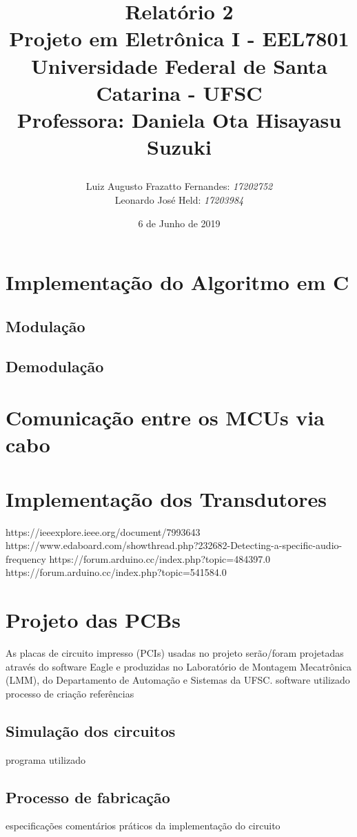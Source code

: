 \documentclass[11pt,a4paper]{report}
\title{Relatório 2  \\
	Projeto em Eletrônica I - EEL7801 \\ \vfill
	\normalsize{Universidade Federal de Santa Catarina - UFSC \\
		Professora: Daniela Ota Hisayasu Suzuki}
	\author{
		{Luiz Augusto Frazatto Fernandes: \it{17202752}} \\
		{Leonardo José Held: \it{17203984}}
}
}
\date{6 de Junho de 2019}
\begin{document}
	\maketitle
\chapter{Implementação do Algoritmo em C}
	\section{Modulação}

	\section{Demodulação}

\chapter{Comunicação entre os MCUs via cabo}
	
	\section{}
	
\chapter{Implementação dos Transdutores}
		https://ieeexplore.ieee.org/document/7993643
		https://www.edaboard.com/showthread.php?232682-Detecting-a-specific-audio-frequency
		https://forum.arduino.cc/index.php?topic=484397.0
		https://forum.arduino.cc/index.php?topic=541584.0
		
\chapter{Projeto das PCBs}
	As placas de circuito impresso (PCIs) usadas no projeto serão/foram projetadas através do software Eagle e produzidas no Laboratório de Montagem Mecatrônica (LMM), do Departamento de Automação e Sistemas da UFSC.
	software utilizado
	processo de criação
	referências
	
	\section{Simulação dos circuitos}
	programa utilizado

	\section{Processo de fabricação}
	especificações
	comentários práticos da implementação do circuito
	
\end{document}

